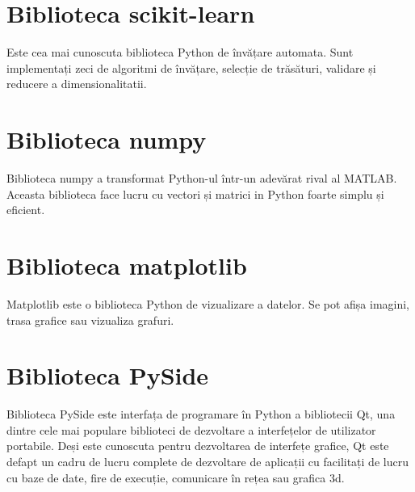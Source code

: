 \section{Biblioteca scikit-learn}

Este cea mai cunoscuta biblioteca Python de învățare automata. Sunt implementați zeci de algoritmi de învățare, selecție de trăsături, validare și reducere a dimensionalitatii.


\section{Biblioteca numpy}

Biblioteca numpy a transformat Python-ul într-un adevărat rival al MATLAB.
Aceasta biblioteca face lucru cu vectori și matrici in Python foarte simplu și eficient.


\section{Biblioteca matplotlib}

Matplotlib este o biblioteca Python de vizualizare a datelor. Se pot afișa imagini, trasa grafice sau vizualiza grafuri.

\section{Biblioteca PySide}

Biblioteca PySide este interfața de programare în Python a bibliotecii Qt, una dintre cele mai populare biblioteci de dezvoltare a interfețelor de utilizator portabile. Deși este cunoscuta pentru dezvoltarea de interfețe grafice, Qt este defapt un cadru de lucru complete de dezvoltare de aplicații cu facilitați de lucru cu baze de date, fire de execuție, comunicare în rețea sau grafica 3d.
